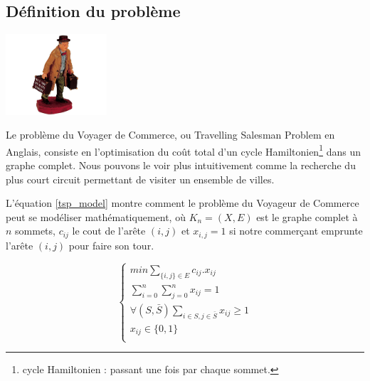 \subsection{Définition du problème}

\begin{minipage}[b]{0.3\linewidth}
\centering
\includegraphics[height=3cm]{../images/salesman2.jpg}
\end{minipage}
\hspace{0.5cm}
\begin{minipage}[b]{0.7\linewidth}
Le problème du Voyager de Commerce, ou \og Travelling Salesman Problem
\fg{} en Anglais, consiste en l'optimisation du coût total d'un cycle
Hamiltonien\footnote{cycle Hamiltonien : passant une fois par chaque
  sommet.} dans un graphe complet. Nous pouvons le voir plus
intuitivement comme la recherche du plus court circuit permettant de
visiter un ensemble de villes.
\end{minipage}

L'équation \ref{tsp_model} montre comment le problème du Voyageur de
Commerce peut se modéliser mathématiquement, où $K_n=(X,E)$ est le
graphe complet à $n$ sommets, $c_{ij}$ le cout de l'arête $(i,j)$ et
$x_{i,j} = 1$ si notre commerçant emprunte l'arête $(i,j)$ pour faire
son tour.

\begin{equation}
\label{tsp_model}
\begin{cases}
min \sum_{\{i, j\} \in E} c_{ij}.x_{ij} \\
\sum_{i=0}^n \sum_{j=0}^n x_{ij} = 1 \\
\forall (S, \bar{S}) \sum_{i \in S, j \in \bar{S}} x_{ij} \geq 1 \\
x_{ij} \in \{0, 1\} \\
\end{cases}
\end{equation}


